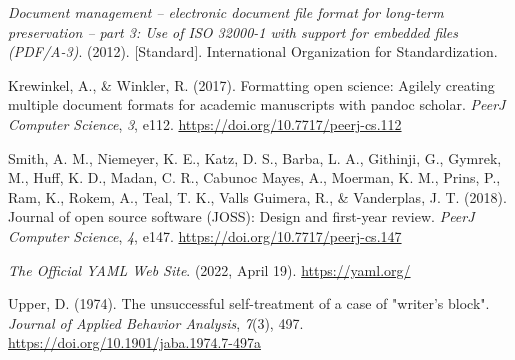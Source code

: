 \documentclass[
]{article}
\newlength{\cslhangindent}
\newlength{\cslentryspacingunit} %
\newenvironment{CSLReferences}[2] %
 {%
  \setlength{\parindent}{0pt}
  \ifodd #1
  \let\oldpar\par
  \def\par{\hangindent=\cslhangindent\oldpar}
  \fi
  \setlength{\parskip}{#2\cslentryspacingunit}
 }%
 {}
\begin{document}
\hypertarget{refs}{}
\begin{CSLReferences}{1}{0}
\leavevmode{}%
\emph{Document management -- electronic document file format for
long-term preservation -- part 3: Use of {ISO} 32000-1 with support for
embedded files ({PDF/A-3})}. (2012). {[}Standard{]}. International
Organization for Standardization.

\leavevmode{}%
Krewinkel, A., \& Winkler, R. (2017). Formatting open science: Agilely
creating multiple document formats for academic manuscripts with pandoc
scholar. \emph{PeerJ Computer Science}, \emph{3}, e112.
\url{https://doi.org/10.7717/peerj-cs.112}

\leavevmode{}%
Smith, A. M., Niemeyer, K. E., Katz, D. S., Barba, L. A., Githinji, G.,
Gymrek, M., Huff, K. D., Madan, C. R., Cabunoc Mayes, A., Moerman, K.
M., Prins, P., Ram, K., Rokem, A., Teal, T. K., Valls Guimera, R., \&
Vanderplas, J. T. (2018). Journal of open source software (JOSS): Design
and first-year review. \emph{PeerJ Computer Science}, \emph{4}, e147.
\url{https://doi.org/10.7717/peerj-cs.147}

\leavevmode{}%
\emph{The {Official YAML Web Site}}. (2022, April 19).
\url{https://yaml.org/}

\leavevmode{}%
Upper, D. (1974). The unsuccessful self-treatment of a case of "writer's
block". \emph{Journal of Applied Behavior Analysis}, \emph{7}(3), 497.
\url{https://doi.org/10.1901/jaba.1974.7-497a}

\end{CSLReferences}
\end{document}

